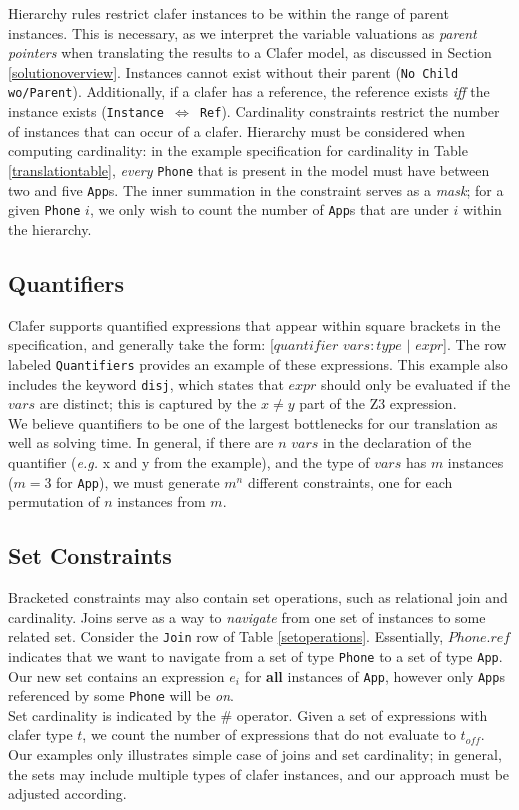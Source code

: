 \documentclass{easychair}
\newcommand{\eg}{\emph{e.g.}\xspace}
\begin{document}
Hierarchy rules restrict clafer instances to be within the range of parent instances. This is necessary, as we interpret the variable valuations as \textit{parent pointers} when translating the results to a Clafer model, as discussed in Section \ref{solutionoverview}. Instances cannot exist without their parent (\texttt{No Child wo/Parent}). Additionally, if a clafer has a reference, the reference exists \textit{iff} the instance exists (\texttt{Instance $\Leftrightarrow$ Ref}). Cardinality constraints restrict the number of instances that can occur of a clafer. Hierarchy must be considered when computing cardinality: in the example specification for cardinality in Table \ref{translationtable}, \textit{every} \texttt{Phone} that is present in the model must have between two and five \texttt{App}s. The inner summation in the constraint serves as a \textit{mask}; for a given \texttt{Phone} $i$, we only wish to count the number of \texttt{App}s that are under $i$ within the hierarchy.    %

\subsection{Quantifiers}
Clafer supports quantified expressions that appear within square brackets in the specification, and generally take the form: [$quantifier$ $vars:type$ $|$ $expr$]. The row labeled \texttt{Quantifiers} provides an example of these expressions. This example also includes the keyword \texttt{disj}, which states that $expr$ should only be evaluated if the $vars$ are distinct; this is captured by the $x \neq y$ part of the Z3 expression. \\
\indent We believe quantifiers to be one of the largest bottlenecks for our translation as well as solving time. In general, if there are $n$ $vars$ in the declaration of the quantifier (\eg x and y from the example), and the type of $vars$ has $m$ instances ($m=3$ for \texttt{App}), we must generate $m^n$ different constraints, one for each permutation of $n$ instances from $m$.

\subsection{Set Constraints}
Bracketed constraints may also contain set operations, such as relational join  and cardinality. 
Joins serve as a way to \textit{navigate} from one set of instances to some related set. Consider the \texttt{Join} row of Table \ref{setoperations}. Essentially, $Phone.ref$ indicates that we want to navigate from a set of type \texttt{Phone} to a set of type \texttt{App}. Our new set contains an expression $e_i$ for \textbf{all} instances of \texttt{App}, however only \texttt{App}s referenced by some \texttt{Phone} will be \textit{on}.\\ 
\indent Set cardinality is indicated by the $\#$ operator. Given a set of expressions with clafer type $t$, we count the number of expressions that do not evaluate to $t_{off}$. Our examples only illustrates simple case of joins and set cardinality; in general, the sets may include multiple types of clafer instances, and our approach must be adjusted according.
\end{document}
